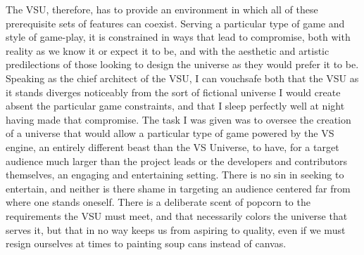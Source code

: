 The VSU, therefore, has to provide an environment in which all of
these prerequisite sets of features can coexist. Serving a particular
type of game and style of game-play, it is constrained in ways that
lead to compromise, both with reality as we know it or expect it to
be, and with the aesthetic and artistic predilections of those looking
to design the universe as they would prefer it to be. Speaking as the
chief architect of the VSU, I can vouchsafe both that the VSU as it
stands diverges noticeably from the sort of fictional universe I would
create absent the particular game constraints, and that I sleep
perfectly well at night having made that compromise. The task I was
given was to oversee the creation of a universe that would allow a
particular type of game powered by the VS engine, an entirely
different beast than the VS Universe, to have, for a target audience
much larger than the project leads or the developers and contributors
themselves, an engaging and entertaining setting. There is no sin in
seeking to entertain, and neither is there shame in targeting an
audience centered far from where one stands oneself. There is a
deliberate scent of popcorn to the requirements the VSU must meet, and
that necessarily colors the universe that serves it, but that in no
way keeps us from aspiring to quality, even if we must resign
ourselves at times to painting soup cans instead of canvas.


